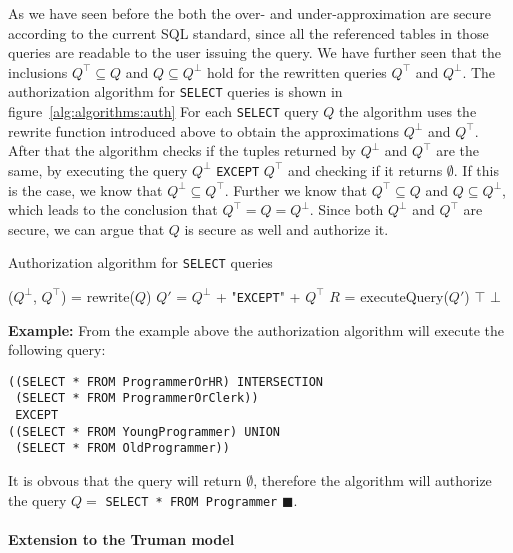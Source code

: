 As we have seen before the both the over- and under-approximation are secure according to the current SQL standard, since all the referenced tables in those queries are readable to the user issuing the query.
%
We have further seen that the inclusions $Q^\top \subseteq Q$ and $Q \subseteq Q^\bot$ hold for the rewritten queries $Q^\top$ and $Q^\bot$.
%
The authorization algorithm for \texttt{SELECT} queries is shown in figure~\ref{alg:algorithms:auth}
%
For each \texttt{SELECT} query $Q$ the algorithm uses the rewrite function introduced above to obtain the approximations $Q^\bot$ and $Q^\top$.
%
After that the algorithm checks if the tuples returned by $Q^\bot$ and $Q^\top$ are the same, by executing the query  $Q^\bot$ \texttt{EXCEPT} $Q^\top$ and checking if it returns $\emptyset$.
%
If this is the case, we know that $Q^\bot \subseteq Q^\top$.
%
Further we know that $Q^\top \subseteq Q$ and $Q \subseteq Q^\bot$, which leads to the conclusion that $Q^\top = Q = Q^\bot$.
%
Since both $Q^\bot$ and $Q^\top$ are secure, we can argue that $Q$ is secure as well and authorize it.
%
\begin{algorithm}
\caption{Authorization algorithm for \texttt{SELECT} queries}
\label{alg:algorithms:auth}
	\SetAlgoLined
	($Q^\bot$, $Q^\top$) = rewrite($Q$)\;
	$Q'$ = $Q^\bot$ + "\texttt{EXCEPT}" + $Q^\top$\;
	$R$ = executeQuery($Q'$)\;
		{\Return $\top$ \;}
		{\Return $\bot$ \;}
\end{algorithm}

\smallskip
\noindent
{\bf Example:}
From the example above the authorization algorithm will execute the following query:
\begin{verbatim}
((SELECT * FROM ProgrammerOrHR) INTERSECTION
 (SELECT * FROM ProgrammerOrClerk))
 EXCEPT
((SELECT * FROM YoungProgrammer) UNION
 (SELECT * FROM OldProgrammer))
\end{verbatim}
\noindent
It is obvous that the query will return $\emptyset$, therefore the algorithm will authorize the query $Q = $ \texttt{SELECT * FROM Programmer} $\blacksquare$.

\paragraph{Extension to the Truman model}

